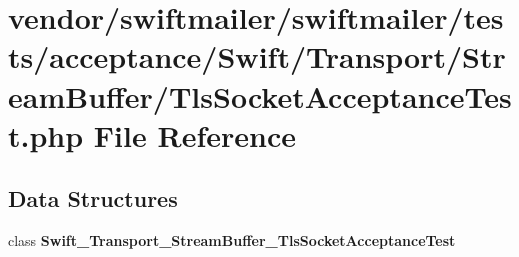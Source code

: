 \section{vendor/swiftmailer/swiftmailer/tests/acceptance/\+Swift/\+Transport/\+Stream\+Buffer/\+Tls\+Socket\+Acceptance\+Test.php File Reference}
\label{_tls_socket_acceptance_test_8php}
\subsection*{Data Structures}
\begin{DoxyCompactItemize}
\item 
class {\bf Swift\+\_\+\+Transport\+\_\+\+Stream\+Buffer\+\_\+\+Tls\+Socket\+Acceptance\+Test}
\end{DoxyCompactItemize}
